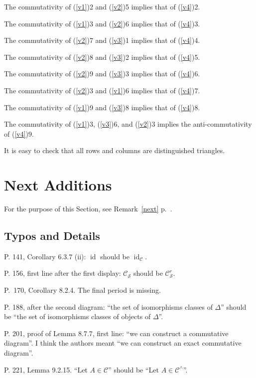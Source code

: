 \documentclass[12pt]{article}
\theoremstyle{remark}%
\newcommand{\n}{\noindent}
\newcommand{\cc}{\mathcal}
\newcommand{\C}{\mathcal C}
\DeclareMathOperator{\id}{id}
\begin{document}
The commutativity of (\ref{v1})2 and (\ref{v2})5 implies that of (\ref{v4})2. 

The commutativity of (\ref{v1})3 and (\ref{v2})6 implies that of (\ref{v4})3.

The commutativity of (\ref{v2})7 and (\ref{v3})1 implies that of (\ref{v4})4.

The commutativity of (\ref{v2})8 and (\ref{v3})2 implies that of (\ref{v4})5. 

The commutativity of (\ref{v2})9 and (\ref{v3})3 implies that of (\ref{v4})6. 

The commutativity of (\ref{v2})3 and (\ref{v1})6 implies that of (\ref{v4})7. 

The commutativity of (\ref{v1})9 and (\ref{v3})8 implies that of (\ref{v4})8. 

The commutativity of (\ref{v1})3, (\ref{v3})6, and (\ref{v2})3 implies the anti-commutativity of (\ref{v4})9. 

It is easy to check that all rows and columns are distinguished triangles. 

\newpage

\section{Next Additions} %
%
For the purpose of this Section, see Remark~\ref{next} p.~\pageref{next}.
%
\subsection{Typos and Details} %
%
\n P. 141, Corollary 6.3.7 (ii): $\id$ should be $\id_\C$. 

\n P. 156, first line after the first display: $\C_{\cc S}$ should be $\C_{\cc S}^r$. 

\n P.~170, Corollary 8.2.4. The final period is missing. 

\n P. 188, after the second diagram: ``the set of isomorphisms classes of $\Delta$'' should be ``the set of isomorphisms classes of objects of $\Delta$''. 


\n P. 201, proof of Lemma 8.7.7, first line: ``we can construct a commutative diagram''. I think the authors meant ``we can construct an exact commutative diagram''. 

\n P. 221, Lemma 9.2.15. ``Let $A\in\C$'' should be ``Let $A\in\C^\wedge$''. 
\end{document}
